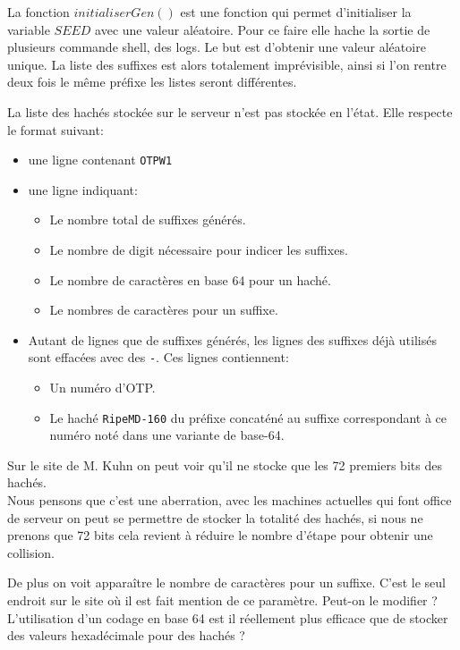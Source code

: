 \documentclass{../res/univ-projet}
\begin{document}
    La fonction $initialiserGen()$ est une fonction qui permet d'initialiser
    la variable $SEED$ avec une valeur aléatoire. Pour ce faire elle hache la sortie
    de plusieurs commande shell, des logs. Le but est d'obtenir une valeur aléatoire
    unique. La liste des suffixes est alors totalement imprévisible, ainsi si l'on rentre
    deux fois le même préfixe les listes seront différentes.

    La liste des hachés stockée sur le serveur n'est pas stockée en l'état. Elle respecte
    le format suivant:
    \begin{itemize}
        \item une ligne contenant \verb?OTPW1?
        \item une ligne indiquant:
            \begin{itemize}
                \item Le nombre total de suffixes générés.
                \item Le nombre de digit nécessaire pour indicer les suffixes.
                \item Le nombre de caractères en base 64 pour un haché.
                \item Le nombres de caractères pour un suffixe.
            \end{itemize}
        \item Autant de lignes que de suffixes générés, les lignes des
            suffixes déjà utilisés sont effacées avec des \verb?-?.
            Ces lignes contiennent:
            \begin{itemize}
                \item Un numéro d'OTP.
                \item Le haché \verb?RipeMD-160? du préfixe concaténé
                    au suffixe correspondant à ce numéro noté dans une variante de base-64.
            \end{itemize}
    \end{itemize}
    Sur le site de M. Kuhn on peut voir qu'il ne stocke que les 72 premiers bits des hachés.\\
    Nous pensons que c'est une aberration, avec les machines actuelles qui font office de serveur
    on peut se permettre de stocker la totalité des hachés, si nous ne prenons que 72 bits
    cela revient à réduire le nombre d'étape pour obtenir une collision.
    
    De plus on voit apparaître le nombre de caractères pour un suffixe. C'est le seul endroit
    sur le site où il est fait mention de ce paramètre. Peut-on le modifier ?\\
    L'utilisation d'un codage en base 64 est il réellement plus efficace que de stocker
    des valeurs hexadécimale pour des hachés ?
\end{document}
